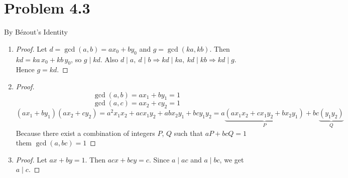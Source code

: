\documentclass[12pt]{article}
\begin{document}
\section*{Problem 4.3}
By Bézout's Identity 
\begin{enumerate}[label=\alph*)]
    \item   
    \begin{proof}
Let $d=\gcd(a,b)=ax_0+by_0$ and $g=\gcd(ka,kb)$. Then $kd=ka\,x_0+kb\,y_0$, so $g\mid kd$.
Also $d\mid a,\ d\mid b \Rightarrow kd\mid ka,\ kd\mid kb \Rightarrow kd\mid g$.
Hence $g=kd$.
\end{proof}
\item
\begin{proof}
    \[\gcd(a, b) = ax_1+by_1 = 1\]
    \[\gcd(a, c) = ax_2+cy_2 = 1\]
    \[(ax_1+by_1)(ax_2+cy_2) = a^2x_1x_2+acx_1y_2+abx_2y_1+bcy_1y_2=a\underbrace{(ax_1x_2+cx_1y_2+bx_2y_1)}_{P} +bc\underbrace{(y_1y_2)}_{Q}\]
    Because there exist a combination of integers $P$, $Q$ such that $aP+bcQ=1$ them $\gcd(a, bc)=1$
    \end{proof}
    \item\begin{proof}
Let $ax+by=1$. Then $acx+bcy=c$. Since $a\mid ac$ and $a\mid bc$, we get $a\mid c$.
\end{proof}

\end{enumerate}
\end{document}
